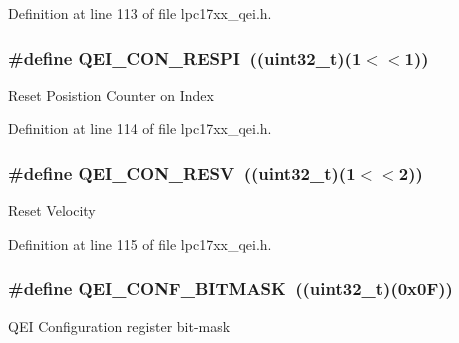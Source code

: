 \-Definition at line 113 of file lpc17xx\-\_\-qei.\-h.

\hypertarget{group___q_e_i___private___macros_ga4d0c708b17d41cf80d5ea34777c1858f}{
\subsubsection[{\-Q\-E\-I\-\_\-\-C\-O\-N\-\_\-\-R\-E\-S\-P\-I}]{\setlength{\rightskip}{0pt plus 5cm}\#define {\bf \-Q\-E\-I\-\_\-\-C\-O\-N\-\_\-\-R\-E\-S\-P\-I}~((uint32\-\_\-t)(1$<$$<$1))}}\label{group___q_e_i___private___macros_ga4d0c708b17d41cf80d5ea34777c1858f}
\-Reset \-Posistion \-Counter on \-Index 

\-Definition at line 114 of file lpc17xx\-\_\-qei.\-h.

\hypertarget{group___q_e_i___private___macros_ga9f1eae1d8a4ba39f3197fdb69bcedc17}{
\subsubsection[{\-Q\-E\-I\-\_\-\-C\-O\-N\-\_\-\-R\-E\-S\-V}]{\setlength{\rightskip}{0pt plus 5cm}\#define {\bf \-Q\-E\-I\-\_\-\-C\-O\-N\-\_\-\-R\-E\-S\-V}~((uint32\-\_\-t)(1$<$$<$2))}}\label{group___q_e_i___private___macros_ga9f1eae1d8a4ba39f3197fdb69bcedc17}
\-Reset \-Velocity 

\-Definition at line 115 of file lpc17xx\-\_\-qei.\-h.

\hypertarget{group___q_e_i___private___macros_ga8bd2265caeb1f3e231f7767a4ba274f2}{
\subsubsection[{\-Q\-E\-I\-\_\-\-C\-O\-N\-F\-\_\-\-B\-I\-T\-M\-A\-S\-K}]{\setlength{\rightskip}{0pt plus 5cm}\#define {\bf \-Q\-E\-I\-\_\-\-C\-O\-N\-F\-\_\-\-B\-I\-T\-M\-A\-S\-K}~((uint32\-\_\-t)(0x0\-F))}}\label{group___q_e_i___private___macros_ga8bd2265caeb1f3e231f7767a4ba274f2}
\-Q\-E\-I \-Configuration register bit-\/mask 

